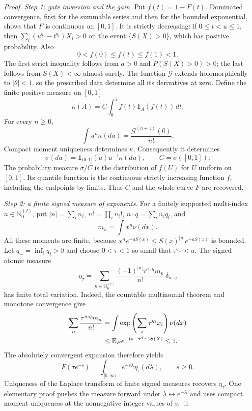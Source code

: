 \documentclass[11pt,letterpaper]{article}
\theoremstyle{definition}
\theoremstyle{remark}
\newcommand{\1}{\mathbf 1}
\begin{document}
\begin{proof}
\emph{Step 1: gate inversion and the gain.}
Put $f(t)=1-F(t)$. Dominated convergence, first for the summable series
and then for the bounded exponential, shows that $F$ is continuous on
$[0,1]$. It is strictly decreasing: if $0\leq t<u\leq1$, then
$\sum_i(u^{q_i}-t^{q_i})X_i>0$ on the event $\{S(X)>0\}$, which has
positive probability. Also
\[
             0<f(0)\leq f(t)\leq f(1)<1.
\]
The first strict inequality follows from $a>0$ and
$P(S(X)>0)>0$; the last follows from $S(X)<\infty$ almost surely.
The function $\mathcal G$ extends holomorphically to $|\theta|<1$,
so the prescribed data determine all its derivatives at zero.
Define the finite positive measure on $[0,1]$
\[
             \kappa(A)=C\int_0^1 f(t)\mathbf1_A(f(t))\,dt.
\]
For every $n\geq0$,
\begin{equation}\label{p08:eq:temp-gate-moments}
       \int u^n\kappa(du)=\frac{\mathcal G^{(n+1)}(0)}{n!}.
\end{equation}
Compact moment uniqueness determines $\kappa$. Consequently it
determines
\[
 \sigma(du)=\mathbf1_{(0,1]}(u)u^{-1}\kappa(du),\qquad
 C=\sigma([0,1]).
\]
The probability measure $\sigma/C$ is the distribution of $f(U)$ for
$U$ uniform on $[0,1]$. Its quantile function is the continuous strictly
increasing function $f$, including the endpoints by limits. Thus $C$
and the whole curve $F$ are recovered.

\emph{Step 2: a finite signed measure of exponents.}
For a finitely supported multi-index $n\in\mathbb N_0^{(I)}$, put
$|n|=\sum_i n_i$, $n!=\prod_i n_i!$, $n\cdot q=\sum_i n_iq_i$, and
\[
                        m_n=\int x^n\nu(dx).
\]
All these moments are finite, because
$x^n e^{-aS(x)}\leq S(x)^{|n|}e^{-aS(x)}$ is bounded.
Let $q_- =\inf_i q_i>0$ and choose $0<\tau<1$ so small that
$\tau^{q_-}<a$. The signed atomic measure
\begin{equation}\label{p08:eq:temp-eta}
 \eta_\tau=\sum_{n\in\mathbb N_0^{(I)}}
       \frac{(-1)^{|n|}\tau^{n\cdot q}m_n}{n!}\,
                         \delta_{n\cdot q}
\end{equation}
has finite total variation. Indeed, the countable multinomial theorem
and monotone convergence give
\begin{align}
 \sum_n\frac{\tau^{n\cdot q}m_n}{n!}
  &=\int\exp\left(\sum_i\tau^{q_i}x_i\right)\nu(dx)\notag\\
  &\leq\mathbb E_P e^{-(a-\tau^{q_-})S(X)}\leq1.
                                                    \label{p08:eq:temp-TV}
\end{align}
The absolutely convergent expansion therefore yields
\begin{equation}\label{p08:eq:temp-Laplace}
       F(\tau e^{-s})=\int_{[0,\infty)}e^{-s\lambda}\eta_\tau(d\lambda),
                    \qquad s\geq0.
\end{equation}
Uniqueness of the Laplace transform of finite signed measures recovers
$\eta_\tau$. One elementary proof pushes the measure forward under
$\lambda\mapsto e^{-\lambda}$ and uses compact moment uniqueness at
the nonnegative integer values of $s$.


\end{proof}
\end{document}
